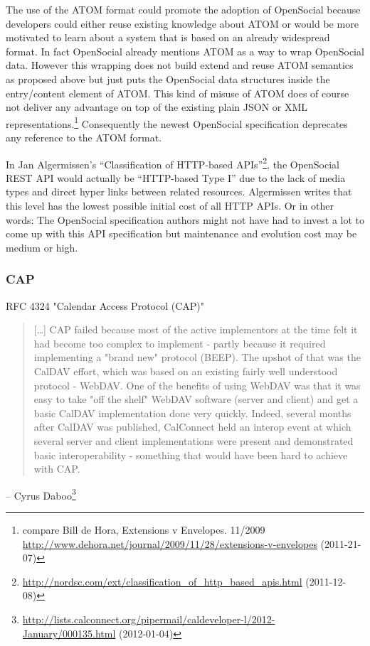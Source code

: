 \documentclass[12pt,a4paper]{scrartcl}		%
\newcommand{\citeurl}[2]{\url{#1} (#2)}
\begin{document}
The use of the ATOM format could promote the adoption of OpenSocial because
developers could either reuse existing knowledge about ATOM or would be more
motivated to learn about a system that is based on an already widespread
format. In fact OpenSocial already mentions ATOM as a way to wrap OpenSocial
data. However this wrapping does not build extend and reuse ATOM semantics as
proposed above but just puts the OpenSocial data structures inside the
entry/content element of ATOM. This kind of misuse of ATOM does of course not
deliver any advantage on top of the existing plain JSON or XML
representations.\footnote{compare Bill de Hora, Extensions v Envelopes. 11/2009 
  \citeurl{http://www.dehora.net/journal/2009/11/28/extensions-v-envelopes}{2011-21-07}}
Consequently the newest OpenSocial specification deprecates any reference to the
ATOM format.

In Jan Algermissen's ``Classification of HTTP-based
APIs''\footnote{\citeurl{http://nordsc.com/ext/classification_of_http_based_apis.html}{2011-12-08}},
the OpenSocial REST API would actually be ``HTTP-based Type I'' due to the lack
of media types and direct hyper links between related resources. Algermissen
writes that this level has the lowest possible initial cost of all HTTP APIs. Or
in other words: The OpenSocial specification authors might not have had to
invest a lot to come up with this API specification but maintenance and
evolution cost may be medium or high.

\subsubsection{CAP}

RFC 4324 "Calendar Access Protocol (CAP)"

\begin{quotation}
  [\ldots] CAP failed because most of the active implementors at the 
time felt it had become too complex to implement - partly because it 
required implementing a "brand new" protocol (BEEP). The upshot of that was 
the CalDAV effort, which was based on an existing fairly well understood 
protocol - WebDAV. One of the benefits of using WebDAV was that it was easy 
to take "off the shelf" WebDAV software (server and client) and get a basic 
CalDAV implementation done very quickly. Indeed, several months after 
CalDAV was published, CalConnect held an interop event at which several 
server and client implementations were present and demonstrated basic 
interoperability - something that would have been hard to achieve with CAP.
\end{quotation}
-- Cyrus Daboo\footnote{\citeurl{http://lists.calconnect.org/pipermail/caldeveloper-l/2012-January/000135.html}{2012-01-04}}
\end{document}
